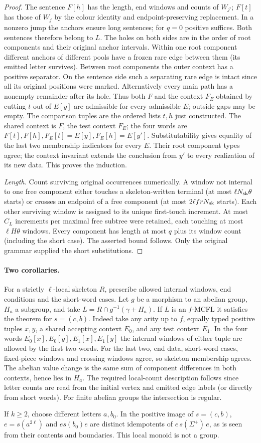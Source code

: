 \documentclass[11pt]{article}
\begin{document}
\begin{proof}
The sentence $F[h]$ has the length, end windows and counts of $W_{j'}$;
$F[t]$ has those of $W_j$ by the colour identity and endpoint-preserving
replacement. In a nonzero jump the anchors ensure long sentences;
for $q=0$ positive suffices. Both sentences therefore belong to $L$.
The holes on both sides are in the order of root components and their
original anchor intervals. Within one root component different anchors
of different pools have a frozen rare edge between them (its emitted
letter survives). Between root components the outer context has a positive
separator. On the sentence side such a separating rare edge is intact
since all its original positions were marked. Alternatively every main
path has a nonempty remainder after its hole. Thus both $F$ and the
context $F_E$ obtained by cutting $t$ out of $E[y]$ are admissible for
every admissible $E$; outside gaps may be empty.
The comparison tuples are the ordered lists $t,h$ just constructed. The
shared context is $F$, the test context $F_E$; the four words are
$F[t],F[h],F_E[t]=E[y],F_E[h]=E[y']$. Substitutability gives equality
of the last two membership indicators for every $E$. Their root component
types agree; the context invariant extends the conclusion from $y'$ to
every realization of its new data. This proves the induction.

\emph{Length.}
Count surviving original occurrences numerically. A window not internal
to one free component either touches a skeleton-written terminal
(at most $\ell N_{\rm sk}\theta$ starts) or crosses an endpoint of a free
component (at most $2\ell frN_{\rm sk}$ starts). Each other surviving
window is assigned to its unique first-touch increment. At most $C_L$
increments per maximal free subtree were retained, each touching at most
$\ell H\theta$ windows. Every component has length at most $q$ plus its
window count (including the short case). The asserted bound follows.
Only the original grammar supplied the short substitutions.
\end{proof}

\paragraph{Two corollaries.}
For a strictly $\ell$-local skeleton $R$, prescribe allowed internal windows,
end conditions and the short-word cases. Let $g$ be a morphism to an abelian
group, $H_a$ a subgroup, and take $L=R\cap g^{-1}(\gamma+H_a)$.
If $L$ is an $f$-MCFL it satisfies the theorem for $s=(c,b)$.
Indeed take any arity up to $f$, equally typed positive tuples $x,y$,
a shared accepting context $E_0$, and any test context $E_1$. In the
four words $E_0[x],E_0[y],E_1[x],E_1[y]$ the internal windows of either
tuple are allowed by the first two words. For the last two, end data,
short-word cases, fixed-piece windows and crossing windows agree, so
skeleton membership agrees. The abelian value change is the same sum
of component differences in both contexts, hence lies in $H_a$.
The required local-count description follows since letter counts are read
from the initial vertex and emitted edge labels (or directly from short
words). For finite abelian groups the intersection is regular.

If $k\ge2$, choose different letters $a,b_0$. In the positive image of
$s=(c,b)$, $e=s(a^{2\ell})$ and $e s(b_0)e$ are distinct idempotents of
$e\,s(\Sigma^+)\,e$, as is seen from their contents and boundaries.
This local monoid is not a group.
\end{document}
